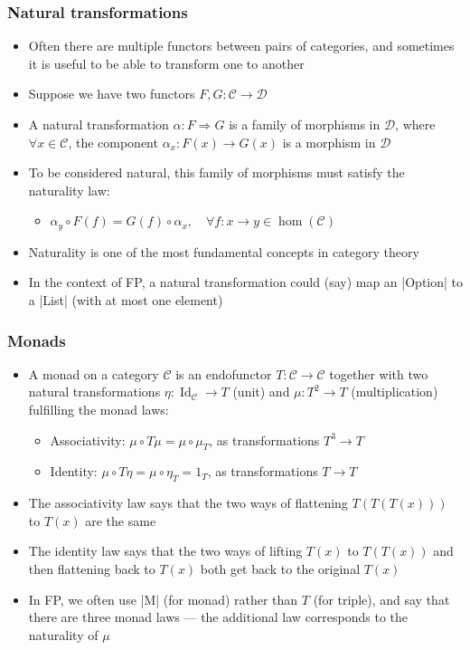 \documentclass[mathserif,handout]{beamer}
\begin{document}
\begin{frame}[fragile]
  \frametitle{Natural transformations}
  \begin{itemize}
  \item Often there are multiple functors between pairs of categories, and sometimes it is useful to be able to transform one to another
  \item Suppose we have two functors $F,G: \mathcal{C}\longrightarrow\mathcal{D}$
  \item A \alert{natural transformation} $\alpha: F \Rightarrow G$ is a family of morphisms in $\mathcal{D}$, where $\forall x\in\mathcal{C}$, the \alert{component} $\alpha_x:F(x)\longrightarrow G(x)$ is a morphism in $\mathcal{D}$
  \item To be considered \alert{natural}, this family of morphisms must satisfy the \alert{naturality law}:
    \begin{itemize}
    \item $\alpha_y\circ F(f) = G(f)\circ \alpha_x,\quad \forall f: x\longrightarrow y \in \operatorname{hom}(\mathcal{C})$
    \end{itemize}
  \item \alert{Naturality} is one of the most fundamental concepts in category theory
    \item In the context of FP, a natural transformation could (say) map an |Option| to a |List| (with at most one element)
  \end{itemize}
\end{frame}

\begin{frame}[fragile]
  \frametitle{Monads}
  \begin{itemize}
  \item A \alert{monad} on a category $\mathcal{C}$ is an endofunctor $T: \mathcal{C}\longrightarrow\mathcal{C}$ together with two natural transformations $\eta: \operatorname{Id}_\mathcal{C} \longrightarrow T$ (\alert{unit}) and $\mu: T^2\longrightarrow T$ (\alert{multiplication}) fulfilling the \alert{monad laws}:
    \begin{itemize}
    \item \alert{Associativity}: $\mu \circ T\mu = \mu \circ \mu_T$, as transformations $T^3\longrightarrow T$
      \item \alert{Identity}: $\mu \circ T\eta = \mu\circ \eta_T = 1_T$, as transformations $T\longrightarrow T$
    \end{itemize}
  \item The associativity law says that the two ways of \alert{flattening} $T(T(T(x)))$ to $T(x)$ are the same
  \item The identity law says that the two ways of \alert{lifting} $T(x)$ to $T(T(x))$ and then flattening back to $T(x)$ both get back to the original $T(x)$
    \item In FP, we often use |M| (for monad) rather than $T$ (for triple), and say that there are three monad laws --- the additional law corresponds to the naturality of $\mu$
  \end{itemize}
\end{frame}
\end{document}

